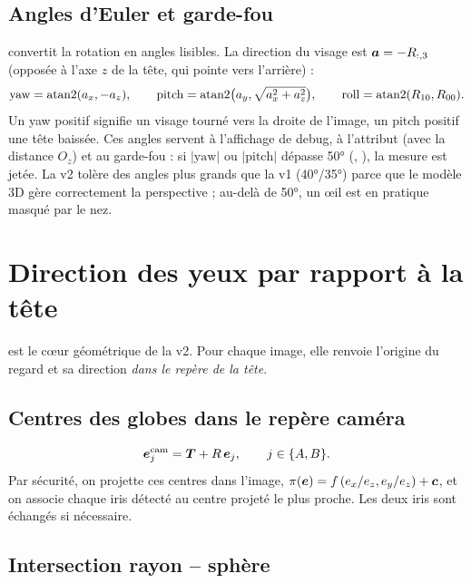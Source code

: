 \subsection{Angles d'Euler et garde-fou}

 convertit la rotation en angles lisibles. La direction du visage est $\bm{a} = -R_{:,3}$ (opposée à l'axe $z$ de la tête, qui pointe vers l'arrière) :
\begin{equation}
  \text{yaw} = \operatorname{atan2}(a_x, -a_z), \qquad \text{pitch} = \operatorname{atan2}\!\big(a_y, \sqrt{a_x^2 + a_z^2}\big), \qquad \text{roll} = \operatorname{atan2}(R_{10}, R_{00}).
\end{equation}
Un yaw positif signifie un visage tourné vers la droite de l'image, un pitch positif une tête baissée. Ces angles servent à l'affichage de debug, à l'attribut  (avec la distance $O_z$) et au garde-fou : si $|\text{yaw}|$ ou $|\text{pitch}|$ dépasse \ang{50} (, \empi), la mesure est jetée. La v2 tolère des angles plus grands que la v1 (\ang{40}/\ang{35}) parce que le modèle 3D gère correctement la perspective ; au-delà de \ang{50}, un œil est en pratique masqué par le nez.

\section{Direction des yeux par rapport à la tête}
\label{sec:observe}

 est le cœur géométrique de la v2. Pour chaque image, elle renvoie l'origine du regard et sa direction \emph{dans le repère de la tête}.

\subsection{Centres des globes dans le repère caméra}

\begin{equation}
  \bm{e}^\text{cam}_j = \bm{T} + R\,\bm{e}_j, \qquad j \in \{A, B\}.
\end{equation}
Par sécurité, on projette ces centres dans l'image, $\pi(\bm{e}) = f\,(e_x/e_z, e_y/e_z) + \bm{c}$, et on associe chaque iris détecté au centre projeté le plus proche. Les deux iris sont échangés si nécessaire.

\subsection{Intersection rayon -- sphère}

